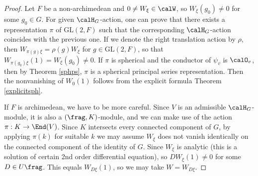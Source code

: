 \documentclass{article}
\newcommand{\GL}{\mathrm{GL}}
\begin{document}
\begin{proof}
Let $F$ be a non-archimedean and $0\neq W_{\xi}\in \calW$, so $W_{\xi}(g_0)\neq 0$ for some $g_0\in G$. For given $\calH_G$-action, one can prove that there exists a representation $\pi$ of $\GL(2, F)$ such that the corresponding $\calH_G$-action coincides with the previous one. If we denote the right translation action by $\rho$, then $W_{\pi(g)\xi} = \rho(g)W_{\xi}$ for $g\in \GL(2, F)$, so that $W_{\pi(g_{0})\xi} (1) = W_{\xi}(g_0)\neq 0$.
If $\pi$ is spherical and the conductor of $\psi_v$ is $\calO_v$, then by Theorem \ref{sphps}, $\pi$ is a spherical principal series representation. Then the nonvanishing of $W_{0}(1)$ follows from the explicit formula Theorem \ref{explicitsph}. 

If $F$ is archimedean, we have to be more careful.  
Since $V$ is an admissible $\calH_G$-module, it is also a $(\frag, K)$-module, and we can make use of the action $\pi : K\to \End(V)$. Since $K$ intersects every connected component of $G$, by applying $\pi(k)$ for suitable $k$ we may assume $W_{\xi}$ does not vanish identically on the connected component of the identity of $G$. 
Since $W_{\xi}$ is analytic (this is a solution of certain 2nd order differential equation), so $DW_{\xi}(1)\neq 0$ for some $D\in U\frag$. 
This equals $W_{D\xi}(1)$, so we may take $W = W_{D\xi}$. 
\end{proof}
\end{document}
